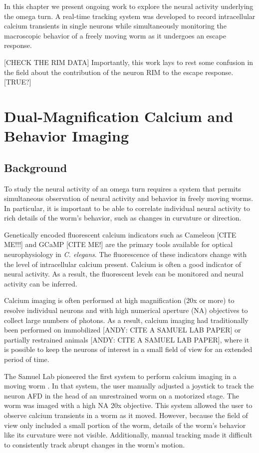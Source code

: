 In this chapter we present ongoing work to explore the neural activity underlying the omega turn. A real-time tracking system was developed to record intracellular calcium transients in single neurons while simultaneously monitoring the macroscopic behavior of a freely moving worm as it undergoes an escape response.

[CHECK THE RIM DATA] Importantly, this work lays to rest some confusion in the field about the contribution of the neuron RIM to the escape response.  [TRUE?]

 
\section{Dual-Magnification Calcium and Behavior Imaging}
\subsection{Background}
To study the neural activity of an omega turn requires a system that permits simultaneous observation of neural activity and behavior in freely moving worms.  In particular, it is important to be able to correlate individual neural activity to rich details of the worm's behavior, such as changes in curvature or direction.


Genetically encoded fluorescent calcium indicators such as Cameleon [CITE ME!!!] and GCaMP [CITE ME!] are the primary tools available for optical neurophysiology in \textit{C. elegans}.  The fluorescence of these indicators change with the level of intracellular calcium present. Calcium is often a good indicator of neural activity. As a result, the fluorescent levels can be monitored and neural activity can be inferred.


Calcium imaging is often performed at high magnification (20x or more)  to resolve individual neurons and with high numerical aperture (NA) objectives to collect large numbers of photons. As a result, calcium imaging had traditionally been  performed on immobilized  [ANDY: CITE A SAMUEL LAB PAPER] or partially restrained animals  [ANDY: CITE A SAMUEL LAB PAPER], where it is possible to keep the neurons of interest in a small field of view for an extended period of time. 

The Samuel Lab pioneered the first system to perform calcium imaging in a moving worm \citep{clark_temporal_2007}. In that system, the user manually adjusted a joystick to track the neuron AFD in the head of an unrestrained worm on a motorized stage. The worm was imaged with a high NA 20x objective. This system allowed the user to observe calcium transients in a worm as it moved. However, because the field of view only included a small portion of the worm, details of the worm's behavior like its curvature were not visible.  Additionally, manual tracking made it difficult to consistently track abrupt changes in the worm's  motion.

